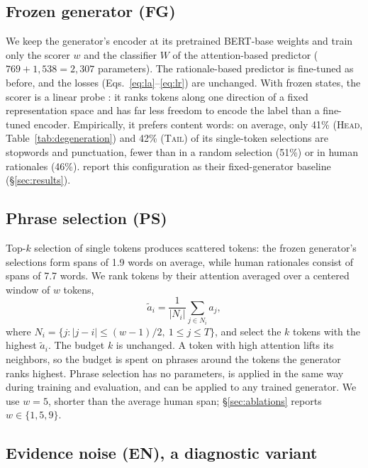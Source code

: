 \documentclass[11pt]{article}
\newcommand{\HEAD}{\textup{\textsc{Head}}}
\newcommand{\TAIL}{\textup{\textsc{Tail}}}
\begin{document}
\subsection{Frozen generator (FG)}

We keep the generator's encoder at its pretrained BERT-base weights and train only the scorer $w$ and the classifier $W$ of the attention-based predictor ($769 + 1{,}538 = 2{,}307$ parameters). The rationale-based predictor is fine-tuned as before, and the losses (Eqs.~\ref{eq:la}--\ref{eq:lr}) are unchanged. With frozen states, the scorer is a linear probe \citep{hewitt-liang-2019-designing}: it ranks tokens along one direction of a fixed representation space and has far less freedom to encode the label than a fine-tuned encoder. Empirically, it prefers content words: on average, only 41\% (\HEAD, Table~\ref{tab:degeneration}) and 42\% (\TAIL) of its single-token selections are stopwords and punctuation, fewer than in a random selection (51\%) or in human rationales (46\%). \citet{storek-etal-2023-unsupervised} report this configuration as their fixed-generator baseline (\S\ref{sec:results}).

\subsection{Phrase selection (PS)}

Top-$k$ selection of single tokens produces scattered tokens: the frozen generator's selections form spans of 1.9 words on average, while human rationales consist of spans of 7.7 words. We rank tokens by their attention averaged over a centered window of $w$ tokens,
\begin{equation}
  \tilde{a}_i = \frac{1}{|N_i|} \sum_{j \in N_i} a_j,
  \label{eq:window}
\end{equation}
where $N_i = \{ j : |j - i| \le (w-1)/2,\ 1 \le j \le T \}$, and select the $k$ tokens with the highest $\tilde{a}_i$. The budget $k$ is unchanged. A token with high attention lifts its neighbors, so the budget is spent on phrases around the tokens the generator ranks highest. Phrase selection has no parameters, is applied in the same way during training and evaluation, and can be applied to any trained generator. We use $w = 5$, shorter than the average human span; \S\ref{sec:ablations} reports $w \in \{1, 5, 9\}$.

\subsection{Evidence noise (EN), a diagnostic variant}
\label{sec:en}
\end{document}

